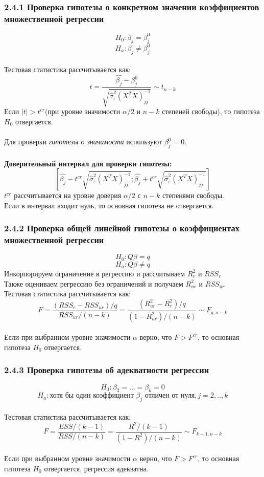 \documentclass[a0,final]{a0poster}
\begin{document}
\begin{multicols}{4}
\subsubsection*{\textbf{2.4.1 Проверка гипотезы о конкретном значении коэффициентов множественной регрессии}}
\[H_0: \beta_j = \beta_j^0\]
\[H_a: \beta_j \ne \beta_j^0\]
\\
Тестовая статистика рассчитывается как:
\[t = \frac{\hat{\beta_j} - \beta_j^0}{\sqrt{\hat{\sigma}^2_{\varepsilon}(X^TX)^{-1}_{jj}}} \sim t_{n-k}\]
Если $|t| > t^{cr}$(при уровне значимости $\alpha/2$ и $n-k$ степеней свободы), то гипотеза $H_0$ отвергается.  \\
\\
Для проверки \textit{гипотезы о значимости} используют $\beta_j^0 = 0$. \\
\\
\textbf{Доверительный интервал для проверки гипотезы:} \\
\[[\hat{\beta_j} - t^{cr}\sqrt{\hat{\sigma}^2_{\varepsilon}(X^TX)^{-1}_{jj}}; \hat{\beta_j} + t^{cr}\sqrt{\hat{\sigma}^2_{\varepsilon}(X^TX)^{-1}_{jj}}]\]
$t^{cr}$ рассчитывается на уровне доверия $\alpha/2$ с $n-k$ степенями свободы.\\
Если в интервал входит нуль, то основная гипотеза не отвергается.
\subsubsection*{\textbf{2.4.2 Проверка общей линейной гипотезы о коэффициентах множественной регрессии}}
\[H_0: Q\beta=q\]
\[H_a: Q\beta \ne q\]
Инкорпорируем ограничение в регрессию и рассчитываем $R^2_r$ и $RSS_r$ \\
Также оцениваем регрессию без ограничений и получаем $R^2_{ur}$ и $RSS_{ur}$
\\
Тестовая статистика рассчитывается как:
\[F = \frac{(RSS_r - RSS_{ur})/q}{RSS_{ur}/(n-k)} = \frac{(R^2_{ur}-R^2_{r})/q}{(1-R^2_{ur})/(n-k)} \sim F_{q, n-k}\] \\
Если при выбранном уровне значимости $\alpha$ верно, что $F > F^{cr}$, то основная гипотеза $H_0$ отвергается.

\subsubsection*{\textbf{2.4.3 Проверка гипотезы об адекватности регрессии}}
\[H_0: \beta_2 = ... = \beta_k = 0\]
\[H_a: \text{хотя бы один коэффициент } \beta_j \text{ отличен от нуля}, j=2,..,k\]
\\
Тестовая статистика рассчитывается как:
\[F = \frac{ESS/(k-1)}{RSS/(n-k)} = \frac{R^2/(k-1)}{(1-R^2)/(n-k)} \sim F_{k-1, n-k}\] \\
Если при выбранном уровне значимости $\alpha$ верно, что $F > F^{cr}$, то основная гипотеза $H_0$ отвергается, регрессия адекватна.


\end{multicols}
\end{document}
